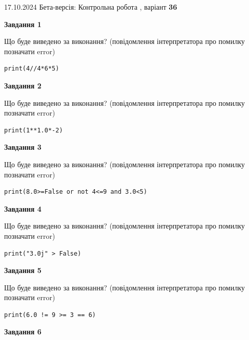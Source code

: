 \documentclass[12pt, ukrainian]{article}
\begin{document}
{\Large{17.10.2024 Бета-версія: Контрольна робота , варіант  \No \textbf { 36 }\par}}
{
\begin {large}
{\begin {center}\textbf{Завдання 1}\end {center}}

Що буде виведено за виконання? (повідомлення інтерпретатора про помилку позначати error)\par
\begin{verbatim}
print(4//4*6*5)
\end{verbatim}

{\begin {center}\textbf{Завдання 2}\end {center}}

Що буде виведено за виконання? (повідомлення інтерпретатора про помилку позначати error)\par
\begin{verbatim}
print(1**1.0*-2)
\end{verbatim}

{\begin {center}\textbf{Завдання 3}\end {center}}

Що буде виведено за виконання? (повідомлення інтерпретатора про помилку позначати error)\par
\begin{verbatim}
print(8.0>=False or not 4<=9 and 3.0<5)
\end{verbatim}

{\begin {center}\textbf{Завдання 4}\end {center}}

Що буде виведено за виконання? (повідомлення інтерпретатора про помилку позначати error)\par
\begin{verbatim}
print("3.0j" > False)
\end{verbatim}

{\begin {center}\textbf{Завдання 5}\end {center}}

Що буде виведено за виконання? (повідомлення інтерпретатора про помилку позначати error)\par
\begin{verbatim}
print(6.0 != 9 >= 3 == 6)
\end{verbatim}

{\begin {center}\textbf{Завдання 6}\end {center}}


\end{large}}
\end{document}
